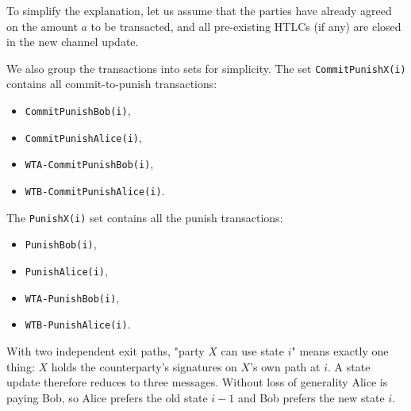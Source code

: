 \documentclass[11pt,a4paper]{article}
\newcommand{\txname}[1]{\texttt{#1}}
\begin{document}
To simplify the explanation, let us assume that the parties have already agreed on the amount $a$ to be transacted, and all pre-existing HTLCs (if any) are closed in the new channel update.

We also group the transactions into sets for simplicity.  The set \txname{CommitPunishX(i)} contains all commit-to-punish transactions: 
\begin{itemize}
    \item \txname{CommitPunishBob(i)},
    \item \txname{CommitPunishAlice(i)},
    \item \txname{WTA-CommitPunishBob(i)},
    \item \txname{WTB-CommitPunishAlice(i)}.
\end{itemize}  

The \txname{PunishX(i)} set contains all the punish transactions: 
\begin{itemize}
    \item \txname{PunishBob(i)}, 
    \item \txname{PunishAlice(i)},
    \item \txname{WTA-PunishBob(i)},
    \item \txname{WTB-PunishAlice(i)}.
\end{itemize}
With two independent exit paths, "party $X$ can use state $i$" means exactly one thing: $X$ holds the counterparty's signatures on $X$'s own path at $i$. A state update therefore reduces to three messages. Without loss of generality Alice is paying Bob, so Alice prefers the old state $i-1$ and Bob prefers the new state $i$.
\end{document}

